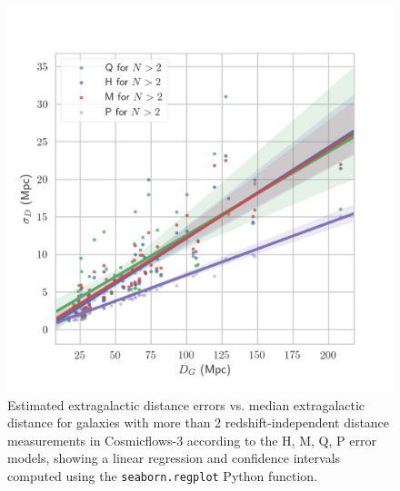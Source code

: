 \documentclass[a4paper,fleqn,usenatbib]{mnras}
\begin{document}
\begin{figure}
	\includegraphics[scale=0.7]{CF3high.png}
    \caption{Estimated extragalactic distance errors vs. median extragalactic distance for galaxies with more than 2 redshift-independent distance measurements in Cosmicflows-3 according to the H, M, Q, P error models, showing a linear regression and confidence intervals computed using the \texttt{seaborn.regplot} Python function.}
    \label{fig:CF3high}
\end{figure}
\end{document}
